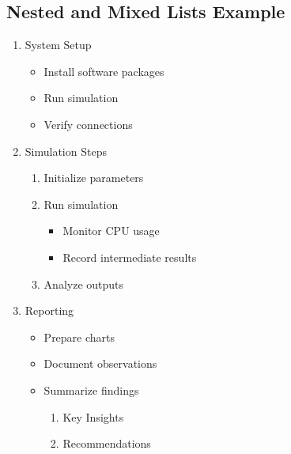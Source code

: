 \documentclass{article}
\begin{document}
\subsection{Nested and Mixed Lists Example}
\begin{enumerate}
    \item System Setup
    \begin{itemize}
        \item Install software packages
        \item Run simulation
        \item[!] Verify connections
    \end{itemize}
    \item Simulation Steps
    \begin{enumerate}
        \item[(a)] Initialize parameters
\clearpage
        \item[(b)] Run simulation
        \begin{itemize}
            \item Monitor CPU usage
            \item Record intermediate results
        \end{itemize}
        \item[(c)] Analyze outputs 
    \end{enumerate}
    \item Reporting
    \begin{itemize}
        \item Prepare charts
        \item Document observations
        \item  Summarize findings
        \begin{enumerate}
            \item[(a)] Key Insights
            \item[(b)] Recommendations
        \end{enumerate}
    \end{itemize}
\end{enumerate}
\end{document}
